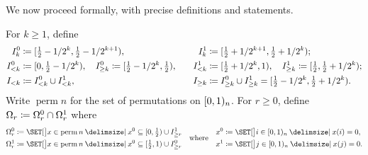 \documentclass{article}
\DeclareMathOperator{\perm}{perm}
\begin{document}
%	
%	
%	

We now proceed formally, with precise definitions and statements.

\begin{defn}
\label{def:harm:1:cuts}
For $k \ge 1$, define
\begin{alignat*}{2}
	I_k^0
&\coloneqq
	[ \tfrac12 - 1/2^k, \tfrac12 - 1/2^{k+1} ),
&\quad
	I_k^1
&\coloneqq
	[ \tfrac12 + 1/2^{k+1}, \tfrac12 + 1/2^k );
\\
	I_{< k}^0
&\coloneqq
	[0, \tfrac12 - 1/2^k),
\quad
	I_{\ge k}^0
\coloneqq
	[ \tfrac12 - 1/2^k, \tfrac12 ),
&\quad
	I_{< k}^1
&\coloneqq
	[ \tfrac12 + 1/2^k, 1 ),
\quad
	I_{\ge k}^1
\coloneqq
	[ \tfrac12, \tfrac12 + 1/2^k );
\\
	I_{< k}
&\coloneqq
	I_{< k}^0 \cup I_{< k}^1,
&\quad
	I_{\ge k}
&\coloneqq
	I_{\ge k}^0 \cup I_{\ge k}^1
=
	[ \tfrac12 - 1/2^k, \tfrac12 + 1/2^k ).
\end{alignat*}
Write $\perm n$ for the set of permutations on $[0,1)_n$.
For $r \ge 0$,
define $\Omega_r \coloneqq \Omega_r^0 \cap \Omega_r^1$
where
\[
\begin{aligned}
	\Omega_r^0
&\cq
	\set*{ x \in \perm n \given x^0 \subseteq \coi{0, \tfrac12} \cup I_{\ge r}^1 }
\\
	\Omega_r^1
&\cq
	\set*{ x \in \perm n \given x^0 \subseteq \coi{\tfrac12, 1} \cup I_{\ge r}^0 }
\end{aligned}
\Qwhere
\begin{aligned}
	x^0
&\cq
	\set*{ i \in \coi{0,1}_n \given x(i) = 0 },
\\
	x^1
&\cq
	\set*{ j \in \coi{0,1}_n \given x(j) = 0 }.
\end{aligned}
\]
\end{defn}
\end{document}
